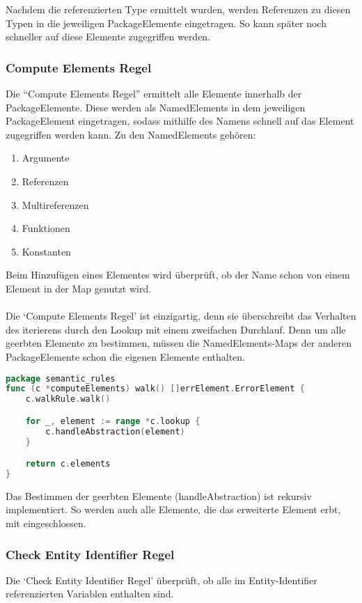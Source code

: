 \documentclass[./einleitung.tex]{subfiles}
\begin{document}
    Nachdem die referenzierten Type ermittelt wurden, werden Referenzen zu diesen Typen in die jeweiligen PackageElemente eingetragen.
    So kann später noch schneller auf diese Elemente zugegriffen werden.

    \subsubsection{Compute Elements Regel}
    Die ``Compute Elements Regel'' ermittelt alle Elemente innerhalb der PackageElemente.
    Diese werden als NamedElements in dem jeweiligen PackageElement eingetragen, sodass mithilfe des Namens schnell auf das Element zugegriffen werden kann.
    Zu den NamedElements gehören:
    \begin{enumerate}
        \item Argumente
        \item Referenzen
        \item Multireferenzen
        \item Funktionen
        \item Konstanten
    \end{enumerate}
    Beim Hinzufügen eines Elementes wird überprüft, ob der Name schon von einem Element in der Map genutzt wird. \\ \\
    Die `Compute Elements Regel' ist einzigartig, denn sie überschreibt das Verhalten des iterierens durch den Lookup mit einem zweifachen Durchlauf.
    Denn um alle geerbten Elemente zu bestimmen, müssen die NamedElements-Maps der anderen PackageElemente schon die eigenen Elemente enthalten.
    \begin{lstlisting}[language=Go]
package semantic_rules
func (c *computeElements) walk() []errElement.ErrorElement {
	c.walkRule.walk()

	for _, element := range *c.lookup {
		c.handleAbstraction(element)
	}

	return c.elements
}
    \end{lstlisting}
    Das Bestimmen der geerbten Elemente (handleAbstraction) ist rekursiv implementiert.
    So werden auch alle Elemente, die das erweiterte Element erbt, mit eingeschlossen.

    \subsubsection{Check Entity Identifier Regel}
    Die `Check Entity Identifier Regel' überprüft, ob alle im Entity-Identifier referenzierten Variablen enthalten sind.
\end{document}

